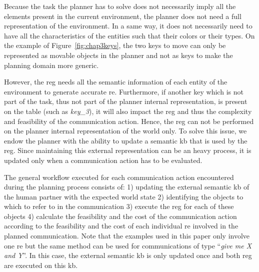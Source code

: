\documentclass[a4paper,11pt,twoside]{StyleThese}
\begin{document}
Because the task the planner has to solve does not necessarily imply all the elements present in the current environment, the planner does not need a full representation of the environment. In a same way, it does not necessarily need to have all the characteristics of the entities such that their colors or their types. On the example of Figure~\ref{fig:chap3keys}, the two keys to move can only be represented as movable objects in the planner and not as keys to make the planning domain more generic. 

However, the \acrshort{reg} needs all the semantic information of each entity of the environment to generate accurate \acrshort{re}. Furthermore, if another key which is not part of the task, thus not part of the planner internal representation, is present on the table (such as \textit{key\_3}), it will also impact the \acrshort{reg} and thus the complexity and feasibility of the communication action. 
Hence, the \acrshort{reg} can not be performed on the planner internal representation of the world only.
To solve this issue, we endow the planner with the ability to update a semantic \acrshort{kb} that is used by the \acrshort{reg}. Since maintaining this external representation can be an heavy process, it is updated only when a communication action has to be evaluated.

The general workflow executed for each communication action encountered during the planning process consists of: 1) updating the external semantic \acrshort{kb} of the human partner with the expected world state 2) identifying the objects to which to refer to in the communication 3) execute the \acrshort{reg} for each of these objects 4) calculate the feasibility and the cost of the communication action according to the feasibility and the cost of each individual \acrshort{re} involved in the planned communication. Note that the examples used in this paper only involve one \acrshort{re} but the same method can be used for communications of type ``\textit{give me X and Y}''. In this case, the external semantic \acrshort{kb} is only updated once and both \acrshort{reg} are executed on this \acrshort{kb}.

\end{document}
